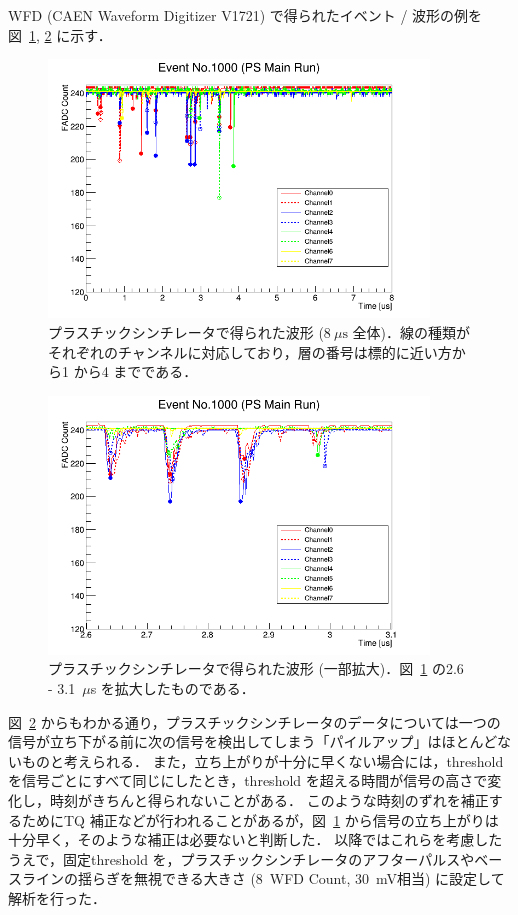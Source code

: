 WFD (CAEN Waveform Digitizer V1721) で得られたイベント / 波形の例を図~\ref{fig:PSEventDisplayAll}, \ref{fig:PSEventDisplayZoom} に示す．
\begin{figure}[h]
	\centering
	\includegraphics[width = 0.9\textwidth]{figure/odagawa/PSEventDisplayAll.png}
	\caption{プラスチックシンチレータで得られた波形 ($8~\mu\mathrm{s}$ 全体)．線の種類がそれぞれのチャンネルに対応しており，層の番号は標的に近い方から1 から4 までである．}
	\label{fig:PSEventDisplayAll}
\end{figure}%
\begin{figure}[h]
	\centering
	\includegraphics[width = 0.9\textwidth]{figure/odagawa/PSEventDisplayZoom.png}
	\caption{プラスチックシンチレータで得られた波形 (一部拡大)．図~\ref{fig:PSEventDisplayAll} の2.6 - 3.1~$\mu$s を拡大したものである．}
	\label{fig:PSEventDisplayZoom}
\end{figure}%
図~\ref{fig:PSEventDisplayZoom} からもわかる通り，プラスチックシンチレータのデータについては一つの信号が立ち下がる前に次の信号を検出してしまう「パイルアップ」はほとんどないものと考えられる．
また，立ち上がりが十分に早くない場合には，threshold を信号ごとにすべて同じにしたとき，threshold を超える時間が信号の高さで変化し，時刻がきちんと得られないことがある．
このような時刻のずれを補正するためにTQ 補正などが行われることがあるが，図~\ref{fig:PSEventDisplayAll} から信号の立ち上がりは十分早く，そのような補正は必要ないと判断した．
以降ではこれらを考慮したうえで，固定threshold を，プラスチックシンチレータのアフターパルスやベースラインの揺らぎを無視できる大きさ (8~WFD Count, 30~mV相当) に設定して解析を行った．

